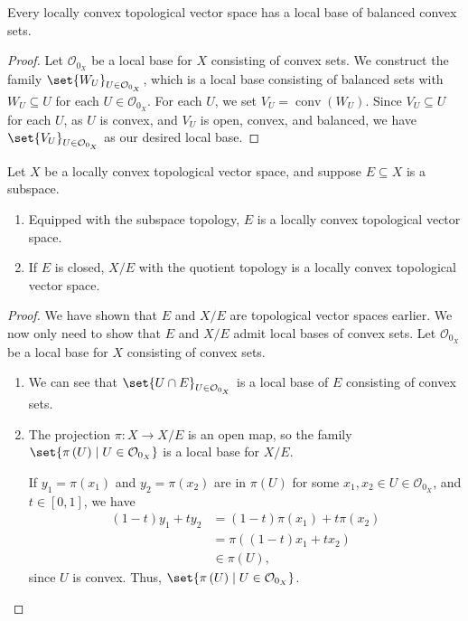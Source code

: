 \documentclass[10pt]{mypackage}
\DeclareMathOperator{\conv}{conv}
\begin{document}
\begin{proposition}
  Every locally convex topological vector space has a local base of balanced convex sets.
\end{proposition}
\begin{proof}
  Let $\mathcal{O}_{0_X}$ be a local base for $X$ consisting of convex sets. We construct the family $\set{W_{U}}_{U\in \mathcal{O}_{0_X}}$, which is a local base consisting of balanced sets with $W_{U}\subseteq U$ for each $U\in \mathcal{O}_{0_X}$. For each $U$, we set $V_{U} = \conv\left(W_{U}\right)$. Since $V_{U}\subseteq U$ for each $U$, as $U$ is convex, and $V_{U}$ is open, convex, and balanced, we have $\set{V_{U}}_{U\in \mathcal{O}_{0_X}}$ as our desired local base.
\end{proof}
\begin{proposition}
  Let $X$ be a locally convex topological vector space, and suppose $E\subseteq X$ is a subspace.
  \begin{enumerate}[(1)]
    \item Equipped with the subspace topology, $E$ is a locally convex topological vector space.
    \item If $E$ is closed, $X/E$ with the quotient topology is a locally convex topological vector space.
  \end{enumerate}
\end{proposition}
\begin{proof}
  We have shown that $E$ and $X/E$ are topological vector spaces earlier. We now only need to show that $E$ and $X/E$ admit local bases of convex sets. Let $\mathcal{O}_{0_X}$ be a local base for $X$ consisting of convex sets.
  \begin{enumerate}[(1)]
    \item We can see that $\set{U\cap E}_{U\in \mathcal{O}_{0_X}}$ is a local base of $E$ consisting of convex sets.
    \item The projection $\pi: X\rightarrow X/E$ is an open map, so the family $\set{\pi\left(U\right)\mid U\in \mathcal{O}_{0_X}}$ is a local base for $X/E$.\newline

      If $y_1 = \pi\left(x_1\right)$ and $y_2 = \pi\left(x_2\right)$ are in $\pi(U)$ for some $x_1,x_2\in U\in \mathcal{O}_{0_X}$, and $t\in [0,1]$, we have
      \begin{align*}
        \left(1-t\right)y_1 + ty_2 &= \left(1-t\right)\pi\left(x_1\right) + t\pi\left(x_2\right)\\
                                   &= \pi\left(\left(1-t\right)x_1 + tx_2\right)\\
                                   &\in \pi(U),
      \end{align*}
      since $U$ is convex. Thus, $\set{\pi\left(U\right)\mid U\in \mathcal{O}_{0_X}}$.
  \end{enumerate}
\end{proof}
\end{document}
